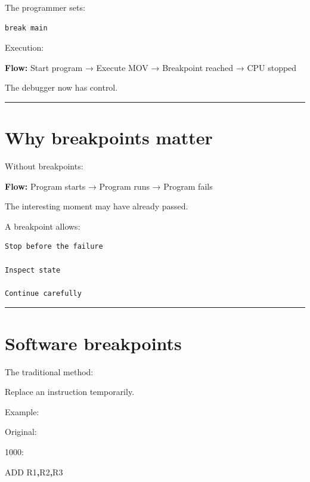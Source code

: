 \documentclass[
  oneside,
  openany]{book}
\newenvironment{Shaded}{\begin{snugshade}}{\end{snugshade}}
\newcommand{\BuiltInTok}[1]{#1}
\newcommand{\NormalTok}[1]{#1}
\newcommand{\OperatorTok}[1]{\textcolor[rgb]{0.81,0.36,0.00}{\textbf{#1}}}
\begin{document}
The programmer sets:

\begin{verbatim}
break main
\end{verbatim}

Execution:

\textbf{Flow:} Start program → Execute MOV → Breakpoint reached → CPU
stopped

The debugger now has control.

\begin{center}\rule{0.5\linewidth}{0.5pt}\end{center}

\hypertarget{why-breakpoints-matter}{%
\section{Why breakpoints matter}\label{why-breakpoints-matter}}

Without breakpoints:

\textbf{Flow:} Program starts → Program runs → Program fails

The interesting moment may have already passed.

A breakpoint allows:

\begin{verbatim}
Stop before the failure

Inspect state

Continue carefully
\end{verbatim}

\begin{center}\rule{0.5\linewidth}{0.5pt}\end{center}

\hypertarget{software-breakpoints}{%
\section{Software breakpoints}\label{software-breakpoints}}

The traditional method:

Replace an instruction temporarily.

Example:

Original:

\begin{Shaded}
\begin{Highlighting}[]
\NormalTok{1000:}

\BuiltInTok{ADD}\NormalTok{ R1}\OperatorTok{,}\NormalTok{R2}\OperatorTok{,}\NormalTok{R3}
\end{Highlighting}
\end{Shaded}
\end{document}
